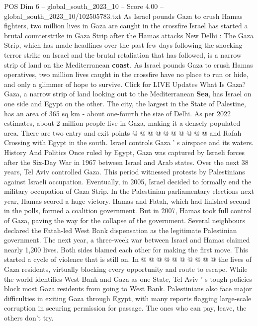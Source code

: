 \begin{textsample}{POS Dim 6 – global\_south\_2023\_10 – Score 4.00 – global\_south\_2023\_10/102505783.txt}  \label{ex:f6_pos_297}
As Israel pounds Gaza to crush Hamas fighters, two million lives in Gaza are caught in the crossfire Israel has started a brutal counterstrike in Gaza Strip after the Hamas attacks New Delhi : The Gaza Strip, which has made headlines over the past few days following the shocking terror strike on Israel and the brutal retaliation that has followed, is a narrow strip of land on the Mediterranean \textbf{coast}.
As Israel pounds Gaza to crush Hamas operatives, two million lives caught in the crossfire have no place to run or hide, and only a glimmer of hope to survive.
Click for LIVE Updates What Is Gaza?
Gaza, a narrow strip of land looking out to the Mediterranean \textbf{Sea}, has Israel on one side and Egypt on the other.
The city, the largest in the State of Palestine, has an area of 365 sq km - about one-fourth the size of Delhi.
As per 2022 estimates, about 2 million people live in Gaza, making it a densely populated area.
There are two entry and exit points @ @ @ @ @ @ @ @ @ @ and Rafah Crossing with Egypt in the south.
Israel controls Gaza ' s airspace and its waters.
History And Politics Once ruled by Egypt, Gaza was captured by Israeli forces after the Six-Day War in 1967 between Israel and Arab states.
Over the next 38 years, Tel Aviv controlled Gaza.
This period witnessed protests by Palestinians against Israeli occupation.
Eventually, in 2005, Israel decided to formally end the military occupation of Gaza Strip.
In the Palestinian parliamentary elections next year, Hamas scored a huge victory.
Hamas and Fatah, which had finished second in the polls, formed a coalition government.
But in 2007, Hamas took full control of Gaza, paving the way for the collapse of the government.
Several neighbours declared the Fatah-led West Bank dispensation as the legitimate Palestinian government.
The next year, a three-week war between Israel and Hamas claimed nearly 1,200 lives.
Both sides blamed each other for making the first move.
This started a cycle of violence that is still on.
In @ @ @ @ @ @ @ @ @ @ the lives of Gaza residents, virtually blocking every opportunity and route to escape.
While the world identifies West Bank and Gaza as one State, Tel Aviv ' s tough policies block most Gaza residents from going to West Bank.
Palestinians also face major difficulties in exiting Gaza through Egypt, with many reports flagging large-scale corruption in securing permission for passage.
The ones who can pay, leave, the others don't try.

\end{textsample}
